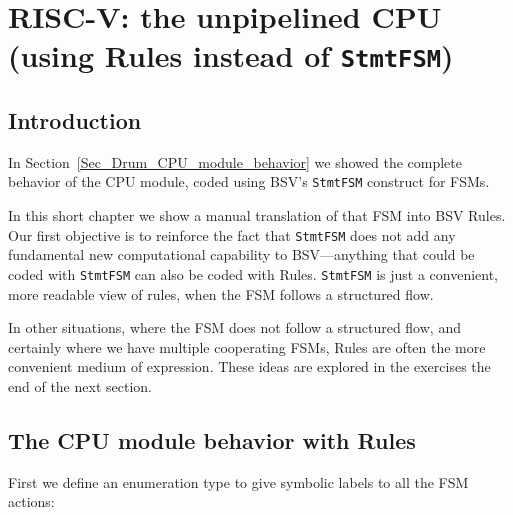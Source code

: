 

\chapter{RISC-V: the {\DRUM} unpipelined CPU (using Rules instead of {\tt StmtFSM})}


\setcounter{page}{1}
\renewcommand{\thepage}{\arabic{chapter}-\arabic{page}}

\label{ch_Drum_Rules}


\section{Introduction}

In Section~\ref{Sec_Drum_CPU_module_behavior} we showed the complete
behavior of the {\DRUM} CPU module, coded using BSV's \verb|StmtFSM|
construct for FSMs.

In this short chapter we show a manual translation of that FSM into
BSV Rules.  Our first objective is to reinforce the fact that
\verb|StmtFSM| does not add any fundamental new computational
capability to BSV---anything that could be coded with \verb|StmtFSM|
can also be coded with Rules.  \verb|StmtFSM| is just a convenient,
more readable view of rules, when the FSM follows a structured flow.

In other situations, where the FSM does not follow a structured flow,
and certainly where we have multiple cooperating FSMs, Rules are often
the more convenient medium of expression.  These ideas are explored in
the exercises the end of the next section.


\section{The {\DRUM} CPU module behavior with Rules}

First we define an enumeration type to give symbolic labels to all the
{\DRUM} FSM actions:


